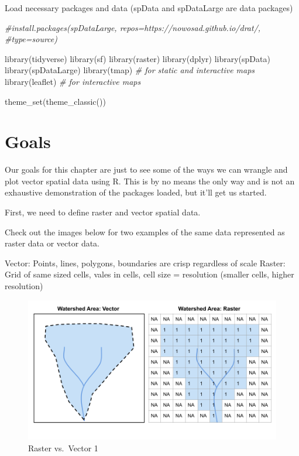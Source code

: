 \documentclass[
]{book}
\newenvironment{Shaded}{\begin{snugshade}}{\end{snugshade}}
\newcommand{\CommentTok}[1]{\textcolor[rgb]{0.56,0.35,0.01}{\textit{#1}}}
\newcommand{\FunctionTok}[1]{\textcolor[rgb]{0.00,0.00,0.00}{#1}}
\newcommand{\NormalTok}[1]{#1}
\begin{document}
Load necessary packages and data (spData and spDataLarge are data packages)

\begin{Shaded}
\begin{Highlighting}[]
\CommentTok{\#install.packages(\textquotesingle{}spDataLarge\textquotesingle{}, repos=\textquotesingle{}https://nowosad.github.io/drat/\textquotesingle{},}
\CommentTok{\#type=\textquotesingle{}source\textquotesingle{})}

\FunctionTok{library}\NormalTok{(tidyverse)}
\FunctionTok{library}\NormalTok{(sf)}
\FunctionTok{library}\NormalTok{(raster)}
\FunctionTok{library}\NormalTok{(dplyr)}
\FunctionTok{library}\NormalTok{(spData)}
\FunctionTok{library}\NormalTok{(spDataLarge)}
\FunctionTok{library}\NormalTok{(tmap)    }\CommentTok{\# for static and interactive maps}
\FunctionTok{library}\NormalTok{(leaflet) }\CommentTok{\# for interactive maps}

\FunctionTok{theme\_set}\NormalTok{(}\FunctionTok{theme\_classic}\NormalTok{())}
\end{Highlighting}
\end{Shaded}

\hypertarget{goals}{%
\section{Goals}\label{goals}}

Our goals for this chapter are just to see some of the ways we can wrangle and plot vector spatial data using R. This is by no means the only way and is not an exhaustive demonstration of the packages loaded, but it'll get us started.

First, we need to define raster and vector spatial data.

Check out the images below for two examples of the same data represented as raster data or vector data.

Vector: Points, lines, polygons, boundaries are crisp regardless of scale Raster: Grid of same sized cells, vales in cells, cell size = resolution (smaller cells, higher resolution)

\begin{figure}
\centering
\includegraphics{images/raster vector1.png}
\caption{Raster vs.~Vector 1}
\end{figure}
\end{document}
